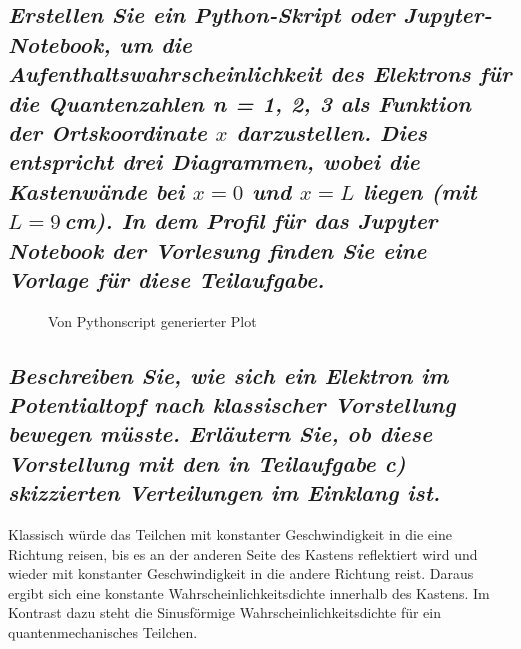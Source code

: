 \documentclass[ex, minted]{exercise_4.0}
\begin{document}
\subsection{\it Erstellen Sie ein Python-Skript oder Jupyter-Notebook, um die Aufenthaltswahrscheinlichkeit des Elektrons für die Quantenzahlen n = 1, 2, 3 als Funktion der Ortskoordinate $x$ darzustellen. Dies entspricht
drei Diagrammen, wobei die Kastenwände bei $x = 0$ und $x = L$ liegen (mit $L = 9\,$cm). In dem Profil für
das Jupyter Notebook der Vorlesung finden Sie eine Vorlage für diese Teilaufgabe.}\vspace{1ex}


\begin{figure}[H]
    \centering
    
    \caption{Von Pythonscript generierter Plot}
\end{figure}

\subsection{\it Beschreiben Sie, wie sich ein Elektron im Potentialtopf nach klassischer Vorstellung bewegen müsste.
Erläutern Sie, ob diese Vorstellung mit den in Teilaufgabe c) skizzierten Verteilungen im Einklang ist.}\vspace{1ex}

Klassisch würde das Teilchen mit konstanter Geschwindigkeit in die eine Richtung reisen, bis es an der anderen Seite des Kastens reflektiert wird und wieder mit konstanter Geschwindigkeit in die andere Richtung reist. Daraus ergibt sich eine konstante Wahrscheinlichkeitsdichte innerhalb des Kastens.
Im Kontrast dazu steht die Sinusförmige Wahrscheinlichkeitsdichte für ein quantenmechanisches Teilchen. 
\end{document}
